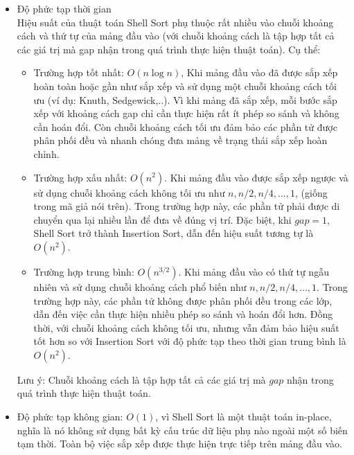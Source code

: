 \begin{itemize}
    \item Độ phức tạp thời gian \cite[p.~83--91]{knuth1998}\\
    Hiệu suất của thuật toán Shell Sort phụ thuộc rất nhiều vào chuỗi 
    khoảng cách và thứ tự của mảng đầu vào (với chuỗi khoảng cách là tập 
    hợp tất cả các giá trị mà gap nhận trong quá trình thực hiện thuật 
    toán). Cụ thể:
    \begin{itemize}[label=$\circ$]
        \item Trường hợp tốt nhất: $O\left(n\log{n}\right)$, Khi mảng đầu vào 
        đã được sắp xếp hoàn toàn hoặc gần như sắp xếp và sử dụng một chuỗi 
        khoảng cách tối ưu (ví dụ: Knuth, Sedgewick,..). Vì khi mảng đã sắp 
        xếp, mỗi bước sắp xếp với khoảng cách gap chỉ cần thực hiện rất ít 
        phép so sánh và không cần hoán đổi. Còn chuỗi khoảng cách tối ưu đảm 
        bảo các phần tử được phân phối đều và nhanh chóng đưa mảng về trạng 
        thái sắp xếp hoàn chỉnh.

        \pagebreak

        \item Trường hợp xấu nhất: $O\left(n^2\right)$. Khi mảng đầu vào được 
        sắp xếp ngược và sử dụng chuỗi khoảng cách không tối ưu như $n,n/2,n/4,
        \ldots,1$, (giống trong mã giả nói trên). Trong trường hợp này, các 
        phần tử phải được di chuyển qua lại nhiều lần để đưa về đúng vị trí. 
        Đặc biệt, khi $gap = 1$, Shell Sort trở thành Insertion Sort, dẫn đến 
        hiệu suất tương tự là $O\left(n^2\right)$.
        \item Trường hợp trung bình: $O\left(n^{3/2}\right)$. Khi mảng đầu vào 
        có thứ tự ngẫu nhiên và sử dụng chuỗi khoảng cách phổ biến như $n,n/2,
        n/4,\ldots,1$. Trong trường hợp này, các phần tử không được phân phối 
        đều trong các lớp, dẫn đến việc cần thực hiện nhiều phép so sánh và 
        hoán đổi hơn. Đồng thời, với chuỗi khoảng cách không tối ưu, nhưng vẫn 
        đảm bảo hiệu suất tốt hơn so với Insertion Sort với độ phức tạp theo 
        thời gian trung bình là $O\left(n^2\right)$.
    \end{itemize}
    Lưu ý: Chuỗi khoảng cách là tập hợp tất cả các giá trị mà $gap$ nhận 
    trong quá trình thực hiện thuật toán.
    
    \item Độ phức tạp không gian: $O\left(1\right)$, vì Shell Sort là một 
    thuật toán in-place, nghĩa là nó không sử dụng bất kỳ cấu trúc dữ liệu 
    phụ nào ngoài một số biến tạm thời. Toàn bộ việc sắp xếp được thực hiện 
    trực tiếp trên mảng đầu vào. 
\end{itemize}
